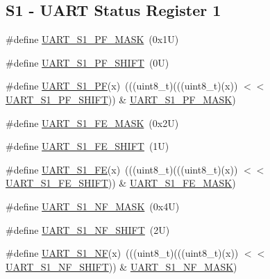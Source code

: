 \subsection*{S1 -\/ U\+A\+RT Status Register 1}
\begin{DoxyCompactItemize}
\item 
\#define \mbox{\hyperlink{group___u_a_r_t___register___masks_ga4116bba67a2cf49c9623e62e3b499ee3}{U\+A\+R\+T\+\_\+\+S1\+\_\+\+P\+F\+\_\+\+M\+A\+SK}}~(0x1\+U)
\item 
\#define \mbox{\hyperlink{group___u_a_r_t___register___masks_ga79ce3db2e0a8eaa687b01942adf36468}{U\+A\+R\+T\+\_\+\+S1\+\_\+\+P\+F\+\_\+\+S\+H\+I\+FT}}~(0\+U)
\item 
\#define \mbox{\hyperlink{group___u_a_r_t___register___masks_ga2bac368f791a24b95f7f99618b6c4200}{U\+A\+R\+T\+\_\+\+S1\+\_\+\+PF}}(x)~(((uint8\+\_\+t)(((uint8\+\_\+t)(x)) $<$$<$ \mbox{\hyperlink{group___u_a_r_t___register___masks_ga79ce3db2e0a8eaa687b01942adf36468}{U\+A\+R\+T\+\_\+\+S1\+\_\+\+P\+F\+\_\+\+S\+H\+I\+FT}})) \& \mbox{\hyperlink{group___u_a_r_t___register___masks_ga4116bba67a2cf49c9623e62e3b499ee3}{U\+A\+R\+T\+\_\+\+S1\+\_\+\+P\+F\+\_\+\+M\+A\+SK}})
\item 
\#define \mbox{\hyperlink{group___u_a_r_t___register___masks_ga83b62a5246fdb7f0aaaffb92074c9e0f}{U\+A\+R\+T\+\_\+\+S1\+\_\+\+F\+E\+\_\+\+M\+A\+SK}}~(0x2\+U)
\item 
\#define \mbox{\hyperlink{group___u_a_r_t___register___masks_ga2795a7498ce3e3d09703c4cec6378531}{U\+A\+R\+T\+\_\+\+S1\+\_\+\+F\+E\+\_\+\+S\+H\+I\+FT}}~(1\+U)
\item 
\#define \mbox{\hyperlink{group___u_a_r_t___register___masks_ga04b763409625dda02fc70e246fe93896}{U\+A\+R\+T\+\_\+\+S1\+\_\+\+FE}}(x)~(((uint8\+\_\+t)(((uint8\+\_\+t)(x)) $<$$<$ \mbox{\hyperlink{group___u_a_r_t___register___masks_ga2795a7498ce3e3d09703c4cec6378531}{U\+A\+R\+T\+\_\+\+S1\+\_\+\+F\+E\+\_\+\+S\+H\+I\+FT}})) \& \mbox{\hyperlink{group___u_a_r_t___register___masks_ga83b62a5246fdb7f0aaaffb92074c9e0f}{U\+A\+R\+T\+\_\+\+S1\+\_\+\+F\+E\+\_\+\+M\+A\+SK}})
\item 
\#define \mbox{\hyperlink{group___u_a_r_t___register___masks_gadfaa4f856facd373c0441b6e89bd87ba}{U\+A\+R\+T\+\_\+\+S1\+\_\+\+N\+F\+\_\+\+M\+A\+SK}}~(0x4\+U)
\item 
\#define \mbox{\hyperlink{group___u_a_r_t___register___masks_ga7b2eb195cce2f086cd1b0c136eced375}{U\+A\+R\+T\+\_\+\+S1\+\_\+\+N\+F\+\_\+\+S\+H\+I\+FT}}~(2\+U)
\item 
\#define \mbox{\hyperlink{group___u_a_r_t___register___masks_ga760a28191818b8f67d146ea395e0fe5c}{U\+A\+R\+T\+\_\+\+S1\+\_\+\+NF}}(x)~(((uint8\+\_\+t)(((uint8\+\_\+t)(x)) $<$$<$ \mbox{\hyperlink{group___u_a_r_t___register___masks_ga7b2eb195cce2f086cd1b0c136eced375}{U\+A\+R\+T\+\_\+\+S1\+\_\+\+N\+F\+\_\+\+S\+H\+I\+FT}})) \& \mbox{\hyperlink{group___u_a_r_t___register___masks_gadfaa4f856facd373c0441b6e89bd87ba}{U\+A\+R\+T\+\_\+\+S1\+\_\+\+N\+F\+\_\+\+M\+A\+SK}})
$$
\end{DoxyCompactItemize}
